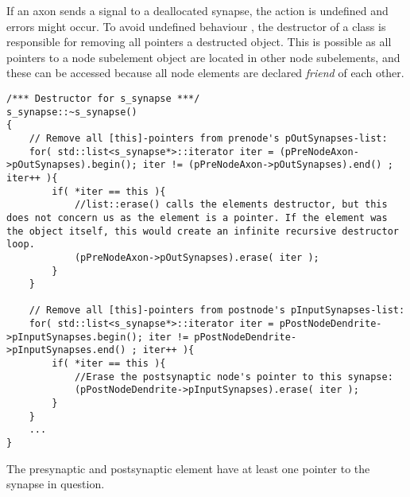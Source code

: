 			If an axon sends a signal to a deallocated synapse, the action is undefined and errors might occur.
			To avoid undefined behaviour%
				, the destructor of a class is responsible for removing all pointers a destructed object.
			This is possible as all pointers to a node subelement object are located in other node subelements, 
				and these can be accessed because all node elements are declared \emph{friend} of each other.
\begin{lstlisting}
/*** Destructor for s_synapse ***/
s_synapse::~s_synapse()
{
	// Remove all [this]-pointers from prenode's pOutSynapses-list:
	for( std::list<s_synapse*>::iterator iter = (pPreNodeAxon->pOutSynapses).begin(); iter != (pPreNodeAxon->pOutSynapses).end() ; iter++ ){
		if( *iter == this ){ 	
			//list::erase() calls the elements destructor, but this does not concern us as the element is a pointer. If the element was the object itself, this would create an infinite recursive destructor loop.
			(pPreNodeAxon->pOutSynapses).erase( iter );
		}
	}

	// Remove all [this]-pointers from postnode's pInputSynapses-list:
	for( std::list<s_synapse*>::iterator iter = pPostNodeDendrite->pInputSynapses.begin(); iter != pPostNodeDendrite->pInputSynapses.end() ; iter++ ){
		if( *iter == this ){ 
			//Erase the postsynaptic node's pointer to this synapse:
			(pPostNodeDendrite->pInputSynapses).erase( iter ); 
		}
	}
	...
}
\end{lstlisting}
		The presynaptic and postsynaptic element have at least one pointer to the synapse in question.
